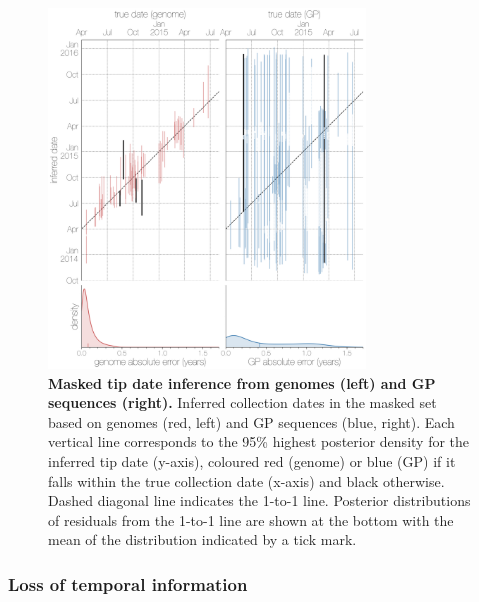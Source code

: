 \documentclass[11pt,oneside,letterpaper]{article}
\begin{document}
\begin{figure}[h]
 \centering
	\includegraphics[width=0.75\textwidth]{figures/fig2_dates.png}
	\caption{\textbf{Masked tip date inference from genomes (left) and GP sequences (right).}
  Inferred collection dates in the masked set based on genomes (red, left) and GP sequences (blue, right).
  Each vertical line corresponds to the 95\% highest posterior density for the inferred tip date (y-axis), coloured red (genome) or blue (GP) if it falls within the true collection date (x-axis) and black otherwise.
  Dashed diagonal line indicates the 1-to-1 line.
  Posterior distributions of residuals from the 1-to-1 line are shown at the bottom with the mean of the distribution indicated by a tick mark.
	}
	\label{dates}
\end{figure}

\subsubsection*{Loss of temporal information}
\end{document}
